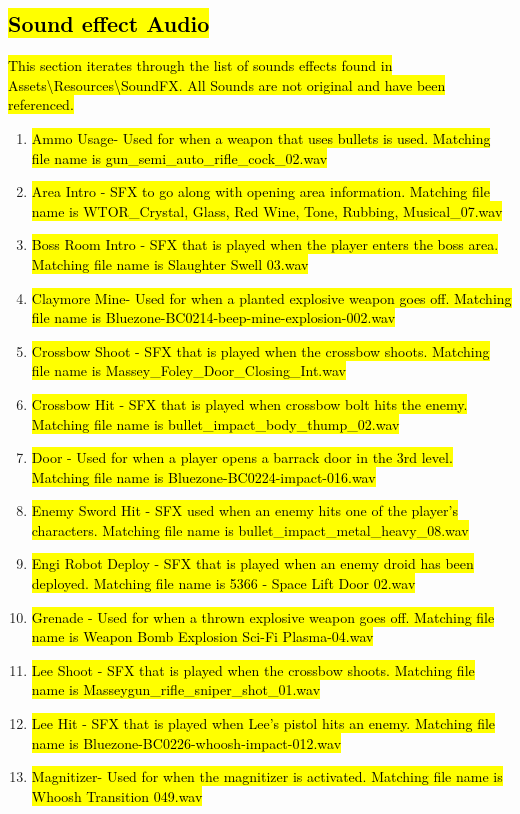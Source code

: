 \documentclass{article}
\begin{document}
\subsection{\hl{Sound effect Audio}}
\hl{This section iterates through the list of sounds effects found in Assets\textbackslash Resources\textbackslash SoundFX. All Sounds are not original and have been referenced.}
\begin{enumerate}
	\item \hl{Ammo Usage- Used for when a weapon that uses bullets is used. Matching file name is gun\_semi\_auto\_rifle\_cock\_02.wav}
	\item \hl{Area Intro - SFX to go along with opening area information. Matching file name is WTOR\_Crystal, Glass, Red Wine, Tone, Rubbing, Musical\_07.wav}
	\item \hl{Boss Room Intro - SFX that is played when the player enters the boss area. Matching file name is Slaughter Swell 03.wav}
	\item \hl{Claymore Mine- Used for when a planted explosive weapon goes off. Matching file name is Bluezone-BC0214-beep-mine-explosion-002.wav}
	\item \hl{Crossbow Shoot - SFX that is played when the crossbow shoots. Matching file name is Massey\_Foley\_Door\_Closing\_Int.wav}
	\item \hl{Crossbow Hit - SFX that is played when crossbow bolt hits the enemy. Matching file name is bullet\_impact\_body\_thump\_02.wav}
	\item \hl{Door - Used for when a player opens a barrack door in the 3rd level. Matching file name is Bluezone-BC0224-impact-016.wav}
	\item \hl{Enemy Sword Hit - SFX used when an enemy hits one of the player's characters. Matching file name is bullet\_impact\_metal\_heavy\_08.wav}
	\item \hl{Engi Robot Deploy - SFX that is played when an enemy droid has been deployed. Matching file name is 5366 - Space Lift Door 02.wav}
	\item \hl{Grenade - Used for when a thrown explosive weapon goes off. Matching file name is Weapon Bomb Explosion Sci-Fi Plasma-04.wav}
	\item \hl{Lee Shoot - SFX that is played when the crossbow shoots. Matching file name is Masseygun\_rifle\_sniper\_shot\_01.wav}
	\item \hl{Lee Hit - SFX that is played when Lee's pistol hits an enemy. Matching file name is Bluezone-BC0226-whoosh-impact-012.wav}
	\item \hl{Magnitizer- Used for when the magnitizer is activated. Matching file name is Whoosh Transition 049.wav}

\end{enumerate}
\end{document}
